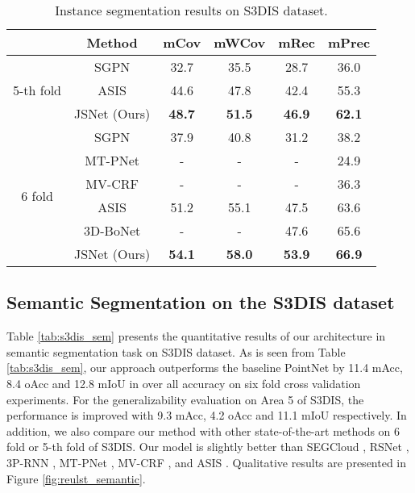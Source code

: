 \documentclass[letterpaper]{article} \usepackage{aaai20}  \usepackage{times}  \usepackage{helvet} \usepackage{courier}  \usepackage[hyphens]{url}  \usepackage{graphicx} \urlstyle{rm} \def\UrlFont{\rm}  \usepackage{graphicx}  \frenchspacing  \setlength{\pdfpagewidth}{8.5in}  \setlength{\pdfpageheight}{11in}
\begin{document}
\begin{table}[t]
	\caption{Instance segmentation results on S3DIS dataset.}
	\smallskip
	\centering
	\resizebox{.95\columnwidth}{!}
	{
		\smallskip
		\begin{tabular}{c|c|c|c|c|c}
			\hline
			~ & Method         & mCov          & mWCov         & mRec          & mPrec \\
			\hline
			\multirow{3}{*}{5-th fold}
			  & SGPN           & 32.7          & 35.5          & 28.7          & 36.0 \\
			~ & ASIS           & 44.6          & 47.8          & 42.4          & 55.3 \\
			~ & JSNet (Ours)   & \textbf{48.7} & \textbf{51.5} & \textbf{46.9} & \textbf{62.1} \\
			\hline\hline
			\multirow{6}{*}{6 fold}
			  & SGPN           & 37.9          & 40.8          & 31.2          & 38.2 \\
			~ & MT-PNet        & -             & -             & -             & 24.9 \\
			~ & MV-CRF         & -             & -             & -             & 36.3 \\
			~ & ASIS 	       & 51.2          & 55.1          & 47.5          & 63.6 \\
			~ & 3D-BoNet       & -             & -             & 47.6          & 65.6 \\
			~ & JSNet (Ours)   & \textbf{54.1} & \textbf{58.0} & \textbf{53.9} & \textbf{66.9} \\
			\hline
		\end{tabular}
	}
	\label{tab:s3dis_ins}
\end{table}

\subsection{Semantic Segmentation on the S3DIS dataset}
Table \ref{tab:s3dis_sem} presents the quantitative results of our architecture in semantic segmentation task on S3DIS dataset. As is seen from Table \ref{tab:s3dis_sem}, our approach outperforms the baseline PointNet \cite{qi2016pointnet} by 11.4 mAcc, 8.4 oAcc and 12.8 mIoU in over all accuracy on six fold cross validation experiments. For the generalizability evaluation on Area 5 of S3DIS,  the performance is improved with 9.3 mAcc, 4.2 oAcc and 11.1 mIoU respectively. In addition, we also compare our method with other state-of-the-art methods on 6 fold or 5-th fold of S3DIS. Our model is slightly better than SEGCloud \cite{tchapmi2017segcloud}, RSNet \cite{huang2018recurrent}, 3P-RNN \cite{ye20183d}, MT-PNet \cite{Pham_2019_CVPR}, MV-CRF \cite{Pham_2019_CVPR}, and ASIS \cite{Wang_2019_CVPR}. Qualitative results are presented in Figure \ref{fig:reulst_semantic}. 
\end{document}
